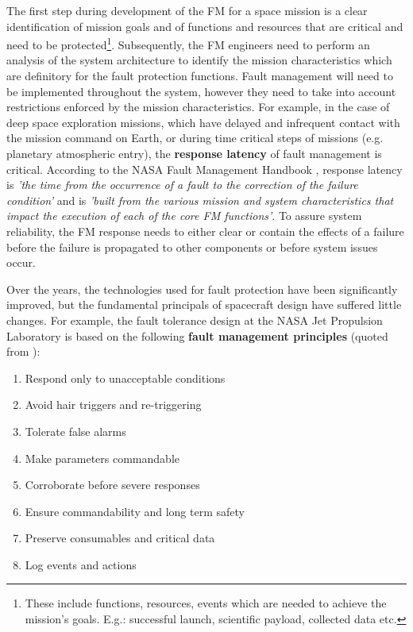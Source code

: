 The first step during development of the FM for a space mission is a clear
identification of mission goals and of functions and resources that are critical
and need to be protected\footnote{These include functions, resources, events
which are needed to achieve the mission's goals. E.g.: successful launch,
scientific payload, collected data etc. }. Subsequently, the FM engineers need
to perform an analysis of the system architecture to identify the mission
characteristics which are definitory for the fault protection functions. Fault
management will need to be implemented throughout the system, however they need
to take into account restrictions enforced by the mission characteristics. For
example, in the case of deep space exploration missions, which have delayed and
infrequent contact with the mission command on Earth, or during time critical
steps of missions (e.g. planetary atmospheric entry), the \textbf{response
latency} of fault management is critical. According to the NASA Fault Management
Handbook \cite{nasa-fm-handbook}, response latency is \textit{'the time from the
occurrence of a fault to the correction of the failure condition'} and is
\textit{'built from the various mission and system characteristics that impact
the execution of each of the core FM functions'}. To assure system reliability,
the FM response needs to either clear or contain the effects of a failure before
the failure is propagated to other components or before system issues occur.

Over the years, the technologies used for fault protection have been
significantly improved, but the fundamental principals of spacecraft design have
suffered little changes. For example, the fault tolerance design at the NASA Jet
Propulsion Laboratory is based on the following \textbf{fault management
principles} (quoted from \cite{fm-jpl}):
\begin{enumerate}
  \item Respond only to unacceptable conditions
  \item Avoid hair triggers and re-triggering
  \item Tolerate false alarms
  \item Make parameters commandable
  \item Corroborate before severe responses
  \item Ensure commandability and long term safety
  \item Preserve consumables and critical data
  \item Log events and actions
\end{enumerate}

